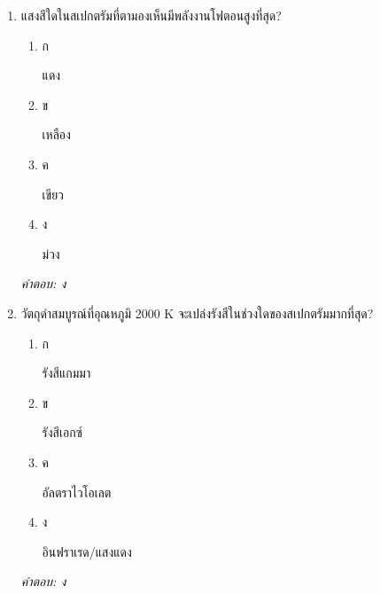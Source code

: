 \documentclass[12pt]{article}
\begin{document}
\begin{enumerate}[label=\arabic*., itemsep=0.5\baselineskip, topsep=0.5\baselineskip, leftmargin=*]
\item แสงสีใดในสเปกตรัมที่ตามองเห็นมีพลังงานโฟตอนสูงที่สุด?
\begin{enumerate}[label=\alph*)., itemsep=0.3\baselineskip, topsep=0.3\baselineskip]
\item ก\ 
\begin{minipage}[t]{0.9\linewidth}
\raggedright แดง
\end{minipage}
\item ข\ 
\begin{minipage}[t]{0.9\linewidth}
\raggedright เหลือง
\end{minipage}
\item ค\ 
\begin{minipage}[t]{0.9\linewidth}
\raggedright เขียว
\end{minipage}
\item ง\ 
\begin{minipage}[t]{0.9\linewidth}
\raggedright ม่วง
\end{minipage}
\end{enumerate}
\vspace{-0.3\baselineskip}
\begin{small}
\textit{คำตอบ: ง}
\end{small}

\item วัตถุดำสมบูรณ์ที่อุณหภูมิ 2000 K จะเปล่งรังสีในช่วงใดของสเปกตรัมมากที่สุด?
\begin{enumerate}[label=\alph*)., itemsep=0.3\baselineskip, topsep=0.3\baselineskip]
\item ก\ 
\begin{minipage}[t]{0.9\linewidth}
\raggedright รังสีแกมมา
\end{minipage}
\item ข\ 
\begin{minipage}[t]{0.9\linewidth}
\raggedright รังสีเอกซ์
\end{minipage}
\item ค\ 
\begin{minipage}[t]{0.9\linewidth}
\raggedright อัลตราไวโอเลต
\end{minipage}
\item ง\ 
\begin{minipage}[t]{0.9\linewidth}
\raggedright อินฟราเรด/แสงแดง
\end{minipage}
\end{enumerate}
\vspace{-0.3\baselineskip}
\begin{small}
\textit{คำตอบ: ง}
\end{small}


\end{enumerate}
\end{document}
